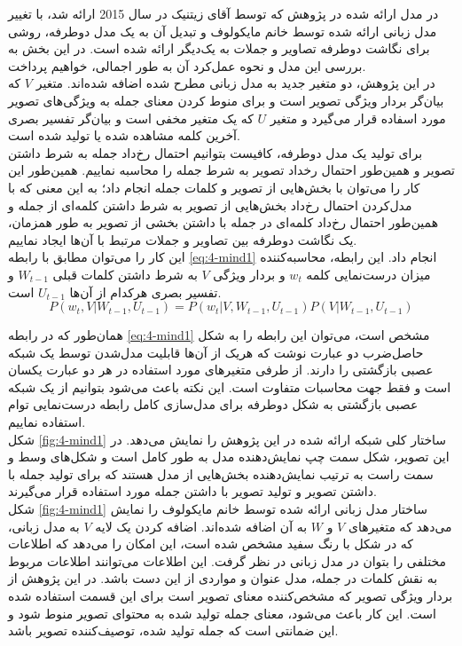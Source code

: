 در مدل ارائه شده در پژوهش \cite{chen2015mind}  که توسط آقای زیتنیک در سال 2015 ارائه شد، با تغییر مدل زبانی ارائه شده توسط خانم مایکولوف و تبدیل آن به یک مدل دوطرفه، روشی برای نگاشت دوطرفه تصاویر و جملات به یک‌دیگر ارائه شده است. در این بخش به بررسی این مدل و نحوه عمل‌کرد آن به طور اجمالی، خواهیم پرداخت.
\\
در این پژوهش، دو متغیر جدید به مدل زبانی مطرح شده اضافه شده‌اند. متغیر $V$ که بیان‌گر بردار ویژگی تصویر است و برای منوط کردن معنای جمله به ویژگی‌های تصویر مورد اسفاده قرار می‌گیرد و متغیر $U$ که یک متغیر مخفی است و بیان‌گر تفسیر بصری آخرین کلمه مشاهده شده یا تولید شده است.
\\
برای تولید یک مدل دوطرفه، کافیست بتوانیم احتمال رخ‌داد جمله به شرط داشتن تصویر و همین‌طور احتمال رخداد تصویر به شرط جمله را محاسبه نماییم. همین‌طور این کار را می‌توان با بخش‌هایی از تصویر و کلمات جمله انجام داد؛ به این معنی که با مدل‌کردن احتمال رخ‌داد بخش‌هایی از تصویر به شرط داشتن کلمه‌ای از جمله و همین‌طور احتمال رخ‌داد کلمه‌ای در جمله با داشتن بخشی از تصویر به طور همزمان، یک نگاشت دوطرفه بین تصاویر و جملات مرتبط با آن‌ها ایجاد نماییم.
\\
این کار را می‌توان مطابق با رابطه \eqref{eq:4-mind1} انجام داد. این رابطه، محاسبه‌کننده میزان درست‌نمایی کلمه $w_t$ و بردار ویژگی $V$ به شرط داشتن کلمات قبلی $W_{t-1}$ و تفسیر بصری هرکدام از آن‌ها $U_{t-1}$ است. 
\begin{equation}
P(w_t, V | W_{t-1} , U_{t-1}) = P(w_t | V, W_{t-1} , U_{t-1}) P(V| W_{t-1}, U_{t-1})
\label{eq:4-mind1}
\end{equation}

همان‌طور که در رابطه \eqref{eq:4-mind1} مشخص است، می‌توان این رابطه را به شکل حاصل‌ضرب دو عبارت نوشت که هریک از آن‌ها قابلیت مدل‌شدن توسط یک شبکه عصبی بازگشتی را دارند. از طرفی متغیر‌های مورد استفاده در هر دو عبارت یکسان است و فقط جهت محاسبات متفاوت است. این نکته باعث می‌شود بتوانیم از یک شبکه عصبی بازگشتی به شکل دوطرفه برای مدل‌سازی کامل رابطه درست‌نمایی توام استفاده نماییم.
\\
شکل \ref{fig:4-mind1} ساختار کلی شبکه ارائه شده در این پژوهش را نمایش می‌دهد. در این تصویر، شکل سمت چپ نمایش‌دهنده مدل به طور کامل است و شکل‌های وسط و سمت راست به ترتیب نمایش‌دهنده بخش‌هایی از مدل هستند که برای تولید جمله با داشتن تصویر و تولید تصویر با داشتن جمله مورد استفاده قرار می‌گیرند.
\\
شکل \ref{fig:4-mind1} ساختار مدل زبانی ارائه شده توسط خانم مایکولوف را نمایش می‌دهد که متغیرهای $V$ و $W$ به آن اضافه شده‌اند. اضافه کردن یک لایه $V$ به مدل زبانی، که در شکل با رنگ سفید مشخص شده است، این امکان را می‌دهد که اطلاعات مختلفی را بتوان در مدل زبانی در نظر گرفت. این اطلاعات می‌توانند اطلاعات مربوط به نقش کلمات در جمله، مدل عنوان و مواردی از این دست باشد. در این پژوهش از بردار ویژگی تصویر که مشخص‌کننده معنای تصویر است برای این قسمت استفاده شده است. این کار باعث می‌شود، معنای جمله تولید شده به محتوای تصویر منوط شود و این ضمانتی است که جمله تولید شده، توصیف‌کننده تصویر باشد.



